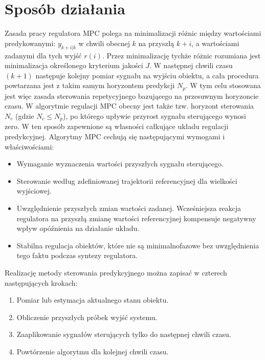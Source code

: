 \section{Sposób działania} \label{sec:howitworks}
Zasada pracy regulatora MPC polega na minimalizacji różnic między wartościami predykowanymi:
$y_{k+i|k}$ w chwili obecnej $k$ na przyszłą $k+i$, a wartościami zadanymi dla tych wyjść $r(i)$.
Przez minimalizację tychże różnic rozumiana jest minimalizacja określonego kryterium jakości $J$. W
następnej chwili czasu $(k+1)$ następuje kolejny pomiar sygnału na wyjściu obiektu, a cała procedura
powtarzana jest z takim samym horyzontem predykcji $N_{p}$. W tym celu stosowana jest
więc zasada sterowania repetycyjnego bazującego na przesuwnym horyzoncie czasu. W algorytmie regulacji MPC
obecny jest także tzw. horyzont sterowania $N_{c}$ (gdzie $N_{c} \leqslant N_{p}$), po którego upływie przyrost sygnału
sterującego wynosi zero. W ten sposób zapewnione są własności całkujące układu regulacji predykcyjnej.
\newline Algorytmy MPC cechują się następującymi wymogami i właściwościami:
\begin{itemize}
	\item Wymaganie wyznaczenia wartości przyszłych sygnału sterującego.
	\item Sterowanie według zdefiniowanej trajektorii referencyjnej dla wielkości wyjściowej.
    \item Uwzględnienie przyszłych zmian wartości zadanej. Wcześniejsza reakcja regulatora na 
    przyszłą zmianę wartości referencyjnej kompensuje negatywny wpływ opóźnienia na działanie układu.
	\item Stabilna regulacja obiektów, które nie są minimalnofazowe bez uwzględnienia tego faktu podczas
    syntezy regulatora.
\end{itemize}
Realizację metody sterowania predykcyjnego można zapisać w czterech następujących krokach:
\begin{enumerate}
    \item Pomiar lub estymacja aktualnego stanu obiektu.
    \item Obliczenie przyszłych próbek wyjść systemu.
    \item Zaaplikowanie sygnałów sterujących tylko do następnej chwili czasu.
    \item Powtórzenie algorytmu dla kolejnej chwili czasu.
\end{enumerate}

